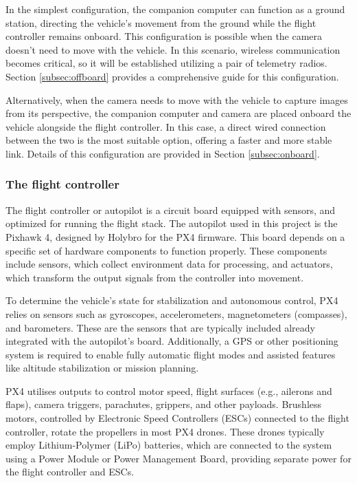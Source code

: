 In the simplest configuration, the companion computer can function as a ground station, directing the vehicle's movement from the ground while the flight controller remains onboard. This configuration is possible when the camera doesn't need to move with the vehicle. In this scenario, wireless communication becomes critical, so it will be established utilizing a pair of telemetry radios. Section \ref{subsec:offboard} provides a comprehensive guide for this configuration.

Alternatively, when the camera needs to move with the vehicle to capture images from its perspective, the companion computer and camera are placed onboard the vehicle alongside the flight controller. In this case, a direct wired connection between the two is the most suitable option, offering a faster and more stable link. Details of this configuration are provided in Section \ref{subsec:onboard}.

\subsubsection{The flight controller}

The flight controller or autopilot is a circuit board equipped with sensors, and optimized for running the flight stack.
The autopilot used in this project is the Pixhawk 4, designed by Holybro for the PX4 firmware.
This board depends on a specific set of hardware components to function properly.
These components include sensors, which collect environment data for processing, and actuators, which transform the output signals from the controller into movement.

To determine the vehicle's state for stabilization and autonomous control, PX4 relies on sensors such as gyroscopes, accelerometers, magnetometers (compasses), and barometers.
These are the sensors that are typically included already integrated with the autopilot's board.
Additionally, a GPS or other positioning system is required to enable fully automatic flight modes and assisted features like altitude stabilization or mission planning.

PX4 utilises outputs to control motor speed, flight surfaces (e.g., ailerons and flaps), camera triggers, parachutes, grippers, and other payloads. Brushless motors, controlled by Electronic Speed Controllers (ESCs) connected to the flight controller, rotate the propellers in most PX4 drones. These drones typically employ Lithium-Polymer (LiPo) batteries, which are connected to the system using a Power Module or Power Management Board, providing separate power for the flight controller and ESCs. 


